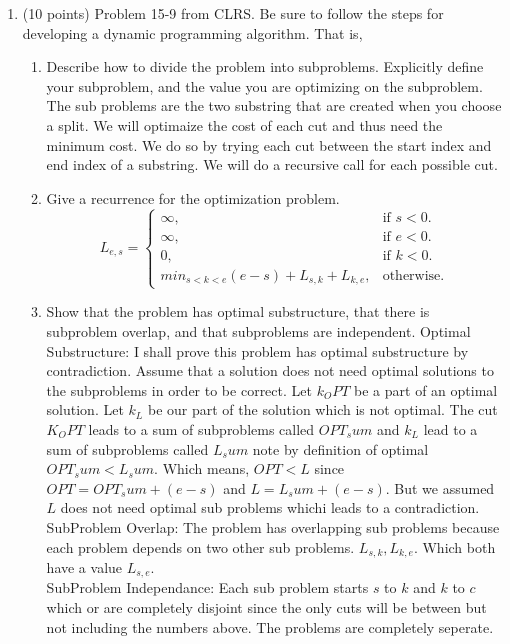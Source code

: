 \documentclass[letterpaper,11pt]{article}
\begin{document}
\begin{enumerate}
\item (10 points) Problem 15-9 from CLRS. Be sure to follow the steps for developing a dynamic programming algorithm. That is,
\begin{enumerate}
\item Describe how to divide the problem into subproblems. Explicitly define your subproblem, and the value you are optimizing on the subproblem.
The sub problems are the two substring that are created when you choose a split. We will optimaize the cost of each cut and thus need the minimum cost. We do so by trying each cut between the start index and end index of a substring. We will do a recursive call for each possible cut.
\item Give a recurrence for the optimization problem.
\begin{equation}
  L_{e,s}=\begin{cases}
    \infty, & \text{if $s<0$}.\\
    \infty, & \text{if $e<0$}.\\
    0, & \text{if $k<0$}.\\
    min_{s<k<e} {(e-s) + L_{s,k}+L_{k,e}}, & \text{otherwise}.
  \end{cases}
\end{equation}

\item Show that the problem has optimal substructure, that there is subproblem overlap, and that subproblems are independent.
Optimal Substructure: I shall prove this problem has optimal substructure by contradiction. Assume that a solution does not need optimal solutions to the subproblems in order to be correct. Let $k_OPT$ be a part of an optimal solution. Let $k_L$ be our part of the solution which is not optimal. The cut $K_OPT$ leads to a sum of subproblems called $OPT_sum$ and $k_L$ lead to a sum of subproblems called $L_sum$ note by definition of optimal $OPT_sum < L_sum$. Which means, $OPT < L$ since $OPT = OPT_sum + (e-s)$ and $L = L_sum + (e-s)$. But we assumed $L$ does not need optimal sub problems whichi leads to a contradiction.\\
SubProblem Overlap: The problem has overlapping sub problems because each problem depends on two other sub problems. $L_{s,k},L_{k,e}$. Which both have a value $L_{s,e}$.\\
SubProblem Independance: Each sub problem starts $s$ to $k$ and $k$ to $c$ which or are completely disjoint since the only cuts will be between but not including the numbers above. The problems are completely seperate.



\end{enumerate}
\end{enumerate}
\end{document}
